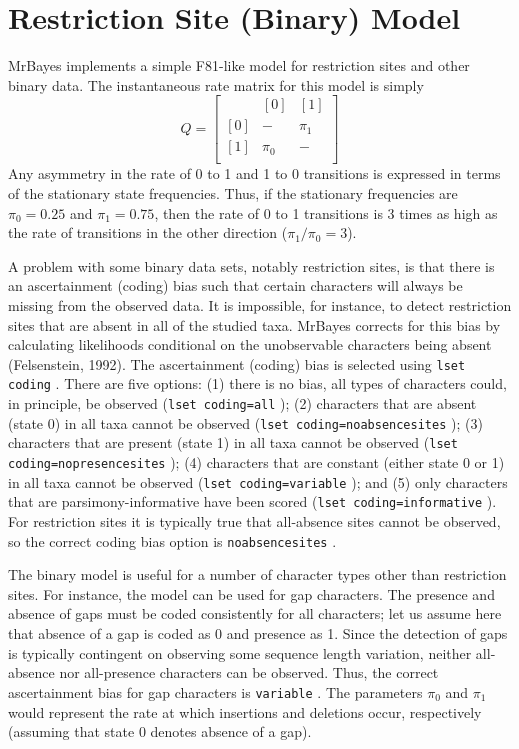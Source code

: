 \documentclass[12pt]{book}
\newcommand{\ttt}[1]{\texttt{#1} }
\begin{document}
\section{Restriction Site (Binary) Model}
MrBayes implements a simple F81-like model for restriction sites and other binary data.  The
instantaneous rate matrix for this model is simply
\[
Q=\begin{bmatrix}
    & [0] & [1]\\ 
 [0]& - & \pi_{1}\\ 
 [1]&  \pi_{0}& - \\ 
\end{bmatrix}
\]
Any asymmetry in the rate of 0 to 1 and 1 to 0 transitions is expressed in terms of the stationary
state frequencies. Thus, if the stationary frequencies are $\pi_0 = 0.25$ and $\pi_1 = 0.75$, then
the rate of 0 to 1 transitions is 3 times as high as the rate of transitions in the other direction
($\pi_1 / \pi_0 = 3$).

A problem with some binary data sets, notably restriction sites, is that there is an ascertainment
(coding) bias such that certain characters will always be missing from the observed data. It is
impossible, for instance, to detect restriction sites that are absent in all of the studied taxa.
MrBayes corrects for this bias by calculating likelihoods conditional on the unobservable
characters being absent (Felsenstein, 1992). The ascertainment (coding) bias is selected using
\ttt{lset coding}. There are five options: (1) there is no bias, all types of characters could, in
principle, be observed (\ttt{lset coding=all}); (2) characters that are absent (state 0) in all
taxa cannot be observed (\ttt{lset coding=noabsencesites}); (3) characters that are present (state
1) in all taxa cannot be observed (\ttt{lset coding=nopresencesites}); (4) characters that are
constant (either state 0 or 1) in all taxa cannot be observed (\ttt{lset coding=variable}); and (5)
only characters that are parsimony-informative have been scored (\ttt{lset coding=informative}).
For restriction sites it is typically true that all-absence sites cannot be observed, so the
correct coding bias option is \ttt{noabsencesites}.

The binary model is useful for a number of character types other than restriction sites. For
instance, the model can be used for gap characters. The presence and absence of gaps must be coded
consistently for all characters; let us assume here that absence of a gap is coded as 0 and
presence as 1. Since the detection of gaps is typically contingent on observing some sequence
length variation, neither all-absence nor all-presence characters can be observed. Thus, the
correct ascertainment bias for gap characters is \ttt{variable}.  The parameters $\pi_0$ and
$\pi_1$ would represent the rate at which insertions and deletions occur, respectively (assuming
that state 0 denotes absence of a gap).
\end{document}
